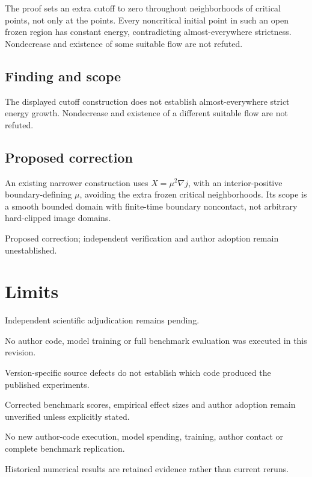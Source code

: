 \documentclass[11pt]{article}
\begin{document}
The proof sets an extra cutoff to zero throughout neighborhoods of critical points, not only at the points. Every noncritical initial point in such an open frozen region has constant energy, contradicting almost-everywhere strictness. Nondecrease and existence of some suitable flow are not refuted.

\subsection*{Finding and scope}

The displayed cutoff construction does not establish almost-everywhere strict energy growth. Nondecrease and existence of a different suitable flow are not refuted.

\subsection*{Proposed correction}

An existing narrower construction uses \(X=\mu^2\nabla j\), with an interior-positive boundary-defining \(\mu\), avoiding the extra frozen critical neighborhoods. Its scope is a smooth bounded domain with finite-time boundary noncontact, not arbitrary hard-clipped image domains.

Proposed correction; independent verification and author adoption remain unestablished.

\section*{Limits}

Independent scientific adjudication remains pending.\par

No author code, model training or full benchmark evaluation was executed in this revision.\par

Version-specific source defects do not establish which code produced the published experiments.\par

Corrected benchmark scores, empirical effect sizes and author adoption remain unverified unless explicitly stated.\par

No new author-code execution, model spending, training, author contact or complete benchmark replication.\par

Historical numerical results are retained evidence rather than current reruns.\par
\end{document}
